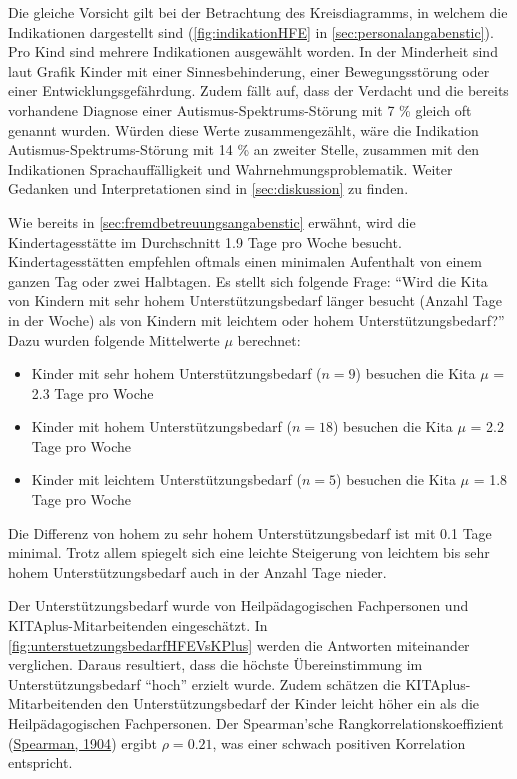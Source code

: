 \documentclass[
  ngerman,
  11pt,
  paper=a4,
  twoside,
  titlepage=true,
  openright,
  abstract=on,
  toc=listofnumbered,
  numbers=noenddot,
  chapterprefix=true,
  headings=optiontohead,
  svgnames,
  dvipsnames]{scrreprt}
\providecommand{\tightlist}{%
  \setlength{\itemsep}{0pt}\setlength{\parskip}{0pt}}
\begin{document}
Die gleiche Vorsicht gilt bei der Betrachtung des Kreisdiagramms, in
welchem die Indikationen dargestellt sind (\cref{fig:indikationHFE} in
\cref{sec:personalangabenstic}). Pro Kind sind mehrere Indikationen
ausgewählt worden. In der Minderheit sind laut Grafik Kinder mit einer
Sinnesbehinderung, einer Bewegungsstörung oder einer
Entwicklungsgefährdung. Zudem fällt auf, dass der Verdacht und die
bereits vorhandene Diagnose einer Autismus-Spektrums-Störung mit 7 \%
gleich oft genannt wurden. Würden diese Werte zusammengezählt, wäre die
Indikation Autismus-Spektrums-Störung mit 14 \% an zweiter Stelle,
zusammen mit den Indikationen Sprachauffälligkeit und
Wahrnehmungsproblematik. Weiter Gedanken und Interpretationen sind in
\cref{sec:diskussion} zu finden.

Wie bereits in \cref{sec:fremdbetreuungsangabenstic} erwähnt, wird die
Kindertagesstätte im Durchschnitt 1.9 Tage pro Woche besucht.
Kindertagesstätten empfehlen oftmals einen minimalen Aufenthalt von
einem ganzen Tag oder zwei Halbtagen. Es stellt sich folgende Frage:
“Wird die Kita von Kindern mit sehr hohem Unterstützungsbedarf länger
besucht (Anzahl Tage in der Woche) als von Kindern mit leichtem oder
hohem Unterstützungsbedarf?” Dazu wurden folgende Mittelwerte \(\mu\)
berechnet:

\begin{itemize}
\tightlist
\item
  Kinder mit sehr hohem Unterstützungsbedarf (\(n = 9\)) besuchen die
  Kita \(\mu\) = 2.3 Tage pro Woche
\item
  Kinder mit hohem Unterstützungsbedarf (\(n = 18\)) besuchen die Kita
  \(\mu\) = 2.2 Tage pro Woche
\item
  Kinder mit leichtem Unterstützungsbedarf (\(n = 5\)) besuchen die Kita
  \(\mu\) = 1.8 Tage pro Woche
\end{itemize}

Die Differenz von hohem zu sehr hohem Unterstützungsbedarf ist mit 0.1
Tage minimal. Trotz allem spiegelt sich eine leichte Steigerung von
leichtem bis sehr hohem Unterstützungsbedarf auch in der Anzahl Tage
nieder.

Der Unterstützungsbedarf wurde von Heilpädagogischen Fachpersonen und
KITAplus-Mitarbeitenden eingeschätzt. In
\cref{fig:unterstuetzungsbedarfHFEVsKPlus} werden die Antworten
miteinander verglichen. Daraus resultiert, dass die höchste
Übereinstimmung im Unterstützungsbedarf “hoch” erzielt wurde. Zudem
schätzen die KITAplus-Mitarbeitenden den Unterstützungsbedarf der Kinder
leicht höher ein als die Heilpädagogischen Fachpersonen. Der
Spearman’sche Rangkorrelationskoeffizient
(\protect\hyperlink{ref-spearmancoeff}{Spearman, 1904}) ergibt
\(\rho = 0.21\), was einer schwach positiven Korrelation entspricht.
\end{document}
